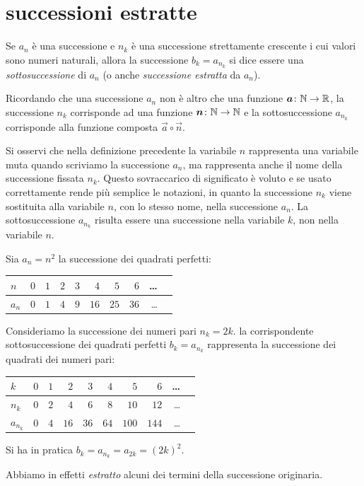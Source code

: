\section{successioni estratte}

\begin{definition}[sottosuccessione]
\mymark{*}
Se $a_n$ è una successione e $n_k$ è una successione strettamente crescente i cui valori sono numeri naturali, allora la successione
$b_k = a_{n_k}$ si dice essere una \emph{sottosuccessione}%
%
 di $a_n$
(o anche \emph{successione estratta} da $a_n$).
\end{definition}

Ricordando che una successione $a_n$ non è altro che una funzione
$\boldsymbol a\colon {\mathbb N} \to {\mathbb R}$, la successione $n_k$ corrisponde ad una funzione
$\boldsymbol n\colon {\mathbb N} \to {\mathbb N}$ e la sottosuccessione $a_{n_k}$ corrisponde alla
funzione composta $\vec a \circ \vec n$.

Si osservi che nella definizione precedente la variabile $n$ rappresenta
una variabile muta quando scriviamo la successione $a_n$, ma
rappresenta anche il nome della successione fissata $n_k$.
Questo sovraccarico
di significato è voluto e se usato correttamente rende più semplice
le notazioni, in quanto la successione $n_k$ viene sostituita alla
variabile $n$, con lo stesso nome, nella successione $a_n$.
La sottosuccessione $a_{n_k}$ risulta essere una successione nella variabile $k$, non nella variabile $n$.

\begin{example}
Sia $a_n = n^2$ la successione dei quadrati perfetti:
\begin{center}
\begin{tabular}{l|rrrrrrrrr}
$n$   & $0$ & $1$ & $2$ & $3$ & $4$  & $5$  & $6$  & \dots \\ \hline
$a_n$ & $0$ & $1$ & $4$ & $9$ & $16$ & $25$ & $36$ & \dots
\end{tabular}
\end{center}
Consideriamo la successione dei numeri pari $n_k = 2k$.
la corrispondente sottosuccessione dei quadrati perfetti
$b_k = a_{n_k}$
rappresenta la successione dei quadrati dei numeri pari:
\begin{center}
\begin{tabular}{l|rrrrrrrrr}
$k$       & $0$ & $1$ & $2$ & $3$ & $4$  & $5$  & $6$  & \dots \\ \hline
$n_k$ & $0$ & $2$ & $4$ & $6$ & $8$ & $10$ & $12$ & \dots \\
$a_{n_k}$ & $0$ & $4$ & $16$ & $36$ & $64$ & $100$ & $144$ & \dots
\end{tabular}
\end{center}
Si ha in pratica
  $b_k = a_{n_k} = a_{2k} = (2k)^2$.

Abbiamo in effetti \emph{estratto} alcuni dei termini della successione
originaria.
\end{example}

